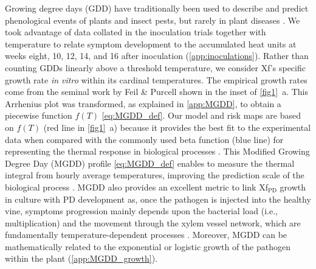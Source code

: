Growing degree days (GDD) have traditionally been used to describe and predict
phenological events of plants and insect pests, but rarely in plant diseases
\cite{McMaster1997}. We took advantage of data collated in the inoculation
trials together with temperature to relate symptom development to the
accumulated heat units at weeks eight, 10, 12, 14, and 16 after inoculation
(\cref{app:inoculations}).  Rather than counting GDDs linearly above a
threshold temperature, we consider Xf's specific growth rate \textit{in vitro}
within its cardinal temperatures. The empirical growth rates come from the
seminal work by Feil \& Purcell \cite{Feil2001} shown in the inset of
\cref{fig1}~\textcolor{ref_color}{a}. This Arrhenius plot was transformed, as
explained in
\cref{app:MGDD}, to obtain a piecewise function $f(T)$
\cref{eq:MGDD_def}. Our model and risk maps are based on $f(T)$ (red line in
\cref{fig1}~\textcolor{ref_color}{a}) because it provides the best fit to the
experimental data when
compared with the commonly used beta function (blue line) for representing the
thermal response in biological processes \cite{Yan1999,Magarey2005}. This
Modified Growing Degree Day (MGDD) profile \cref{eq:MGDD_def} enables to
measure the thermal integral from hourly average temperatures, improving the
prediction scale of the biological process \cite{butikofer2020problem}. MGDD
also provides an excellent metric to link Xf$_{\textrm{PD}}$ growth in culture
with PD development as, once the pathogen is injected into the healthy vine,
symptoms progression mainly depends upon the bacterial load (i.e.,
multiplication) and the movement through the xylem vessel network, which are
fundamentally temperature-dependent processes
\cite{fry1990multiplication,Feil2001}. Moreover, MGDD can be mathematically
related to the exponential or logistic growth of the pathogen within the plant
(\cref{app:MGDD_growth}).

